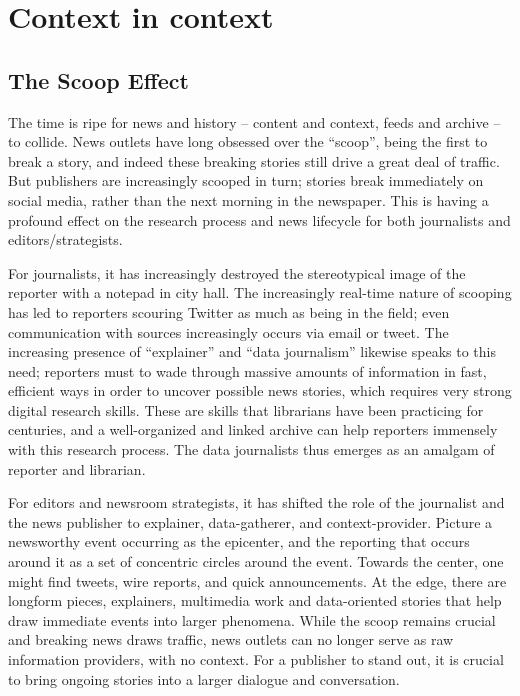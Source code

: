 \section{Context in context}


\subsection{The Scoop Effect} %

The time is ripe for news and history -- content and context, feeds and archive -- to collide. News outlets have long obsessed over the ``scoop'', being the first to break a story, and indeed these breaking stories still drive a great deal of traffic. But publishers are increasingly scooped in turn; stories break immediately on social media, rather than the next morning in the newspaper. %
This is having a profound effect on the research process and news lifecycle for both journalists and editors/strategists.

For journalists, it has increasingly destroyed the stereotypical image of the reporter with a notepad in city hall. The increasingly real-time nature of scooping has led to reporters scouring Twitter as much as being in the field; even communication with sources increasingly occurs via email or tweet. The increasing presence of ``explainer'' and ``data journalism'' likewise speaks to this need; reporters must to wade through massive amounts of information in fast, efficient ways in order to uncover possible news stories, which requires very strong digital research skills. These are skills that librarians have been practicing for centuries, and a well-organized and linked archive can help reporters immensely with this research process. The data journalists thus emerges as an amalgam of reporter and librarian.

For editors and newsroom strategists, it has shifted the role of the journalist and the news publisher to explainer, data-gatherer, and context-provider. Picture a newsworthy event occurring as the epicenter, and the reporting that occurs around it as a set of concentric circles around the event. Towards the center, one might find tweets, wire reports, and quick announcements. At the edge, there are longform pieces, explainers, multimedia work and data-oriented stories that help draw immediate events into larger phenomena. While the scoop remains crucial and breaking news draws traffic, news outlets can no longer serve as raw information providers, with no context. For a publisher to stand out, it is crucial to bring ongoing stories into a larger dialogue and conversation.


